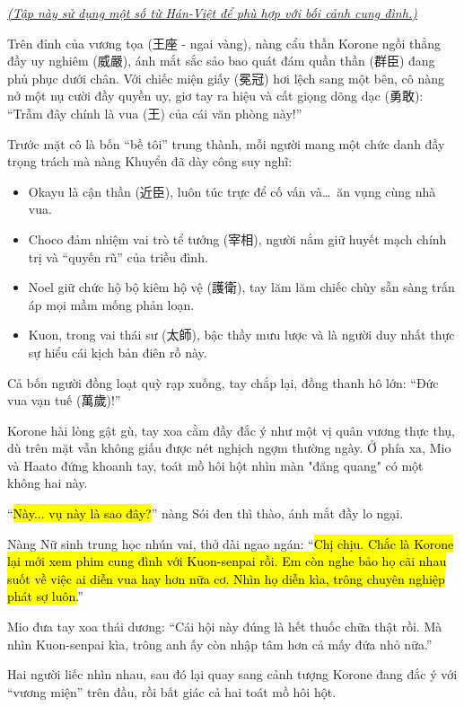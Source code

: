 \documentclass[../main.tex]{subfiles}
\begin{document}
\begin{center}
  \textit{\uline{(Tập này sử dụng một số từ Hán-Việt để phù hợp với bối cảnh cung đình.)}}
\end{center}

Trên đỉnh của vương tọa (王座 - ngai vàng), nàng cẩu thần Korone ngồi thẳng đầy uy nghiêm (威嚴), ánh mắt sắc sảo bao quát đám quần thần (群臣) đang phủ phục dưới chân. Với chiếc miện giấy (冕冠) hơi lệch sang một bên, cô nàng nở một nụ cười đầy quyền uy, giơ tay ra hiệu và cất giọng dõng dạc (勇敢): ``Trẫm đây chính là vua (王) của cái văn phòng này!''


Trước mặt cô là bốn ``bề tôi'' trung thành, mỗi người mang một chức danh đầy trọng trách mà nàng Khuyển đã dày công suy nghĩ:
\begin{itemize}
  \item Okayu là cận thần (近臣), luôn túc trực để cố vấn và\dots\ ăn vụng cùng nhà vua.
  \item Choco đảm nhiệm vai trò tể tướng (宰相), người nắm giữ huyết mạch chính trị và ``quyến rũ'' của triều đình.
  \item Noel giữ chức hộ bộ kiêm hộ vệ (護衛), tay lăm lăm chiếc chùy sẵn sàng trấn áp mọi mầm mống phản loạn.
  \item Kuon, trong vai thái sư (太師), bậc thầy mưu lược và là người duy nhất thực sự hiểu cái kịch bản điên rồ này.
\end{itemize}

Cả bốn người đồng loạt quỳ rạp xuống, tay chắp lại, đồng thanh hô lớn: ``Đức vua vạn tuế (萬歲)!''

Korone hài lòng gật gù, tay xoa cằm đầy đắc ý như một vị quân vương thực thụ, dù trên mặt vẫn không giấu được nét nghịch ngợm thường ngày. Ở phía xa, Mio và Haato đứng khoanh tay, toát mồ hôi hột nhìn màn "đăng quang" có một không hai này.

``\hl{Này... vụ này là sao đây?}'' nàng Sói đen thì thào, ánh mắt đầy lo ngại.

Nàng Nữ sinh trung học nhún vai, thở dài ngao ngán: ``\hl{Chị chịu. Chắc là Korone lại mới xem phim cung đình với Kuon-senpai rồi. Em còn nghe bảo họ cãi nhau suốt về việc ai diễn vua hay hơn nữa cơ. Nhìn họ diễn kìa, trông chuyên nghiệp phát sợ luôn.}''

Mio đưa tay xoa thái dương: ``Cái hội này đúng là hết thuốc chữa thật rồi. Mà nhìn Kuon-senpai kìa, trông anh ấy còn nhập tâm hơn cả mấy đứa nhỏ nữa.''

Hai người liếc nhìn nhau, sau đó lại quay sang cảnh tượng Korone đang đắc ý với ``vương miện'' trên đầu, rồi bất giác cả hai toát mồ hôi hột.
\end{document}
